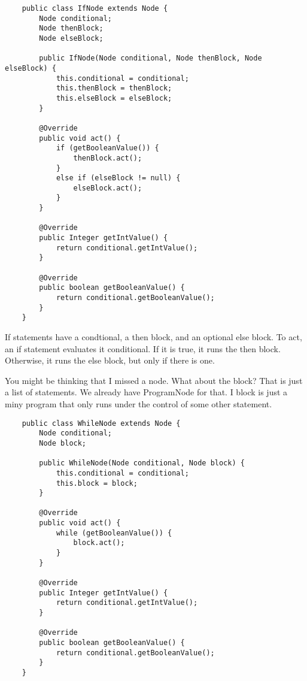 {\footnotesize
\begin{verbatim}
    public class IfNode extends Node {
        Node conditional;
        Node thenBlock;
        Node elseBlock;
    
        public IfNode(Node conditional, Node thenBlock, Node elseBlock) {
            this.conditional = conditional;
            this.thenBlock = thenBlock;
            this.elseBlock = elseBlock;
        }
    
        @Override
        public void act() {
            if (getBooleanValue()) {
                thenBlock.act();
            }
            else if (elseBlock != null) {
                elseBlock.act();
            }
        }
    
        @Override
        public Integer getIntValue() {
            return conditional.getIntValue();
        }
    
        @Override
        public boolean getBooleanValue() {
            return conditional.getBooleanValue();
        }
    }
\end{verbatim}
}

If statements have a condtional, a then block, and an optional else block.
To act, an if statement evaluates it conditional. If it is true, it runs the
then block. Otherwise, it runs the else block, but only if there is one.

You might be thinking that I missed a node. What about the block? That is
just a list of statements. We already have ProgramNode for that. I block
is just a miny program that only runs under the control of some other statement.

{\footnotesize
\begin{verbatim}
    public class WhileNode extends Node {
        Node conditional;
        Node block;
    
        public WhileNode(Node conditional, Node block) {
            this.conditional = conditional;
            this.block = block;
        }
    
        @Override
        public void act() {
            while (getBooleanValue()) {
                block.act();
            }
        }
    
        @Override
        public Integer getIntValue() {
            return conditional.getIntValue();
        }
    
        @Override
        public boolean getBooleanValue() {
            return conditional.getBooleanValue();
        }
    }
\end{verbatim}
}

